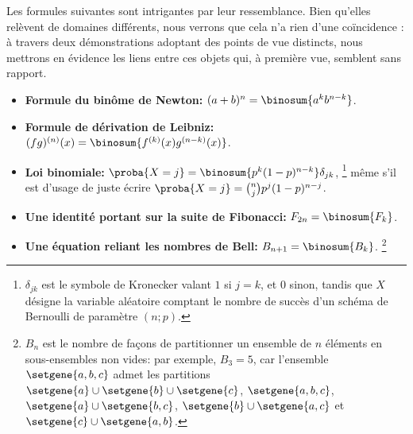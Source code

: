 Les formules suivantes sont intrigantes par leur ressemblance. Bien qu’elles relèvent de domaines différents, nous verrons que cela n'a rien d'une coïncidence : à travers deux démonstrations adoptant des points de vue distincts, nous mettrons en évidence les liens entre ces objets qui, à première vue, semblent sans rapport.
%
\begin{itemize}
    \item \textbf{Formule du binôme de Newton:}
    $(a + b)^n = \binosum{a^k b^{n-k}}$.


    \item \textbf{Formule de dérivation de Leibniz:}
    $(fg)^{(n)}(x) = \binosum{f^{(k)}(x) g^{(n-k)}(x)}$.


    \item \textbf{Loi binomiale:}
    $\proba{X = j} = \binosum{p^k (1 - p)^{n-k}} \delta_{jk}$,%
    \footnote{
    	$\delta_{jk}$ est le symbole de Kronecker valant $1$ si $j=k$, et $0$ sinon,
		tandis que
		$X$ désigne la variable aléatoire comptant le nombre de succès d'un schéma de Bernoulli de paramètre $(n ; p)$.
    }
    même s'il est d'usage de juste écrire
    $\proba{X = j} =\binom{n}{j} p^j (1 - p)^{n-j}$.


    \item \textbf{Une identité portant sur la suite de Fibonacci:}
    $F_{2n} = \binosum{F_k}$.


    \item \textbf{Une équation reliant les nombres de Bell:}
    $B_{n+1} = \binosum{B_k}$.%
    \footnote{
    	$B_n$ est le nombre de façons de partitionner un ensemble de $n$ éléments en sous-ensembles non vides:
		par exemple,
		$B_3 = 5$,
		car l'ensemble $\setgene{ a , b , c }$ admet les partitions
		$\setgene{ a } \cup \setgene{ b } \cup \setgene{ c }$,
		$\setgene{ a , b , c }$,
		$\setgene{ a } \cup \setgene{ b , c }$,
		$\setgene{ b } \cup \setgene{ a , c }$ et
		$\setgene{ c } \cup \setgene{ a , b }$.
    }
\end{itemize}